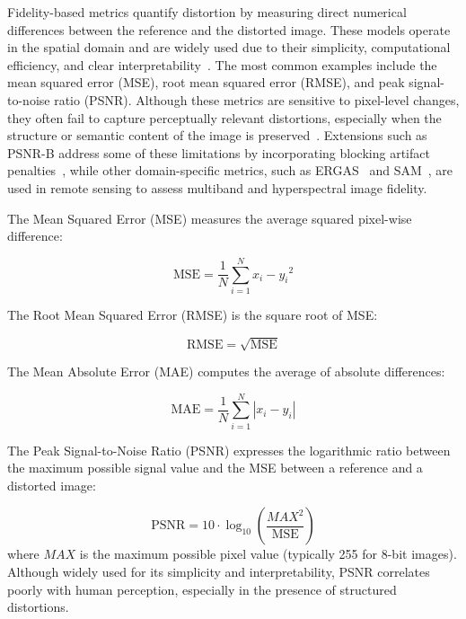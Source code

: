 Fidelity-based metrics quantify distortion by measuring direct numerical differences between the reference and the distorted image. These models operate in the spatial domain and are widely used due to their simplicity, computational efficiency, and clear interpretability~\cite{gonzalez2002digital, wang2009mean}. The most common examples include the mean squared error (MSE), root mean squared error (RMSE), and peak signal-to-noise ratio (PSNR). Although these metrics are sensitive to pixel-level changes, they often fail to capture perceptually relevant distortions, especially when the structure or semantic content of the image is preserved~\cite{wang2004image, chandler2007vsnr}. Extensions such as PSNR-B address some of these limitations by incorporating blocking artifact penalties~\cite{yim2011psnrb}, while other domain-specific metrics, such as ERGAS~\cite{ranchin2000ergas} and SAM~\cite{kruse1993sam}, are used in remote sensing to assess multiband and hyperspectral image fidelity.

The Mean Squared Error (MSE) measures the average squared pixel-wise difference:

\begin{equation}
\text{MSE} = \frac{1}{N} \sum_{i=1}^{N} {x_i - y_i}^2
\end{equation}

The Root Mean Squared Error (RMSE) is the square root of MSE:\@

\begin{equation}
\text{RMSE} = \sqrt{\text{MSE}}
\end{equation}

The Mean Absolute Error (MAE) computes the average of absolute differences:

\begin{equation}
\text{MAE} = \frac{1}{N} \sum_{i=1}^{N} |x_i - y_i|
\end{equation}

The Peak Signal-to-Noise Ratio (PSNR) expresses the logarithmic ratio between the maximum possible signal value and the MSE between a reference and a distorted image:

\begin{equation}
\text{PSNR} = 10 \cdot \log_{10} \left( \frac{MAX^2}{\text{MSE}} \right)
\end{equation}
where $MAX$ is the maximum possible pixel value (typically 255 for 8-bit images). Although widely used for its simplicity and interpretability, PSNR correlates poorly with human perception, especially in the presence of structured distortions. 

